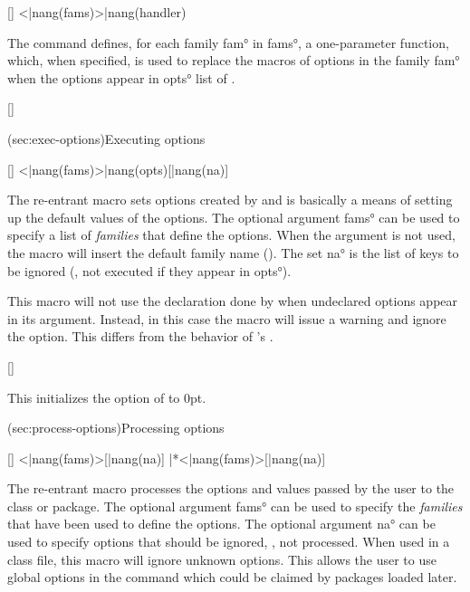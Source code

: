 \documentclass[
  use-a4-paper,
  use-10pt-font,
  final-version,
  use-UK-English,
  fancy-section-headings,
  frame-section-numbers,
  para-abstract-style,
  input-config-file,
  no-hyperref-messages
]{amltxdoc}
\def\xdecs{\fx{\XDeclareOption}\Redstar\sspace}
\begin{document}
{[\XInvalidOptionHandler]
\XInvalidOptionHandler<|nang(fams)>{|nang(handler)}
\fxim*{\XInvalidOptionHandler}

The command \fx{\XInvalidOptionHandler} defines, for each family \ang{fam} in \ang{fams}, a one-parameter function, which, when specified, is used to replace the macros of options in the family \ang{fam} when the options appear in \ang{opts} list of \fx{\XDeclareInvalidOptions}.

[\XInvalidOptionHandler]


\docsubsection(sec:exec-options){Executing options}

[\XExecuteOptions]
\XExecuteOptions<|nang(fams)>{|nang(opts)}[|nang(na)]
\fxim*{\XExecuteOptions}

The re-entrant \fx{\XExecuteOptions} macro sets options created by \fx{\XDeclareOption} and is basically a means of setting up the default values of the options. The optional argument \ang{fams} can be used to specify a list of \emph{families} that define the options. When the argument is not used, the macro will insert the default family name (). The set \ang{na} is the list of keys to be ignored (\ie, not executed if they appear in \ang{opts}).

This macro will not use the declaration done by \xdecs when undeclared options appear in its argument. Instead, in this case the macro will issue a warning and ignore the option. This differs from the behavior of \latex's \hx{\ExecuteOptions}.

[\XExecuteOptions]
\dummyfxi*{\XExecuteOptions}

This initializes the option \hx{\leftmargin} of  to 0pt.


\docsubsection(sec:process-options){Processing options}

[\XProcessOptions]
\XProcessOptions<|nang(fams)>[|nang(na)]
\XProcessOptions|*<|nang(fams)>[|nang(na)]
\fxim*{\XProcessOptions}

The re-entrant \fx{\XProcessOptions} macro processes the options and values passed by the user to the class or package. The optional argument \ang{fams} can be used to specify the \emph{families} that have been used to define the options. The optional argument \ang{na} can be used to specify options that should be ignored, \ie, not processed. When used in a class file, this macro will ignore unknown options. This allows the user to use global options in the \hx{\documentclass} command which could be claimed by packages loaded later.

}
\end{document}
